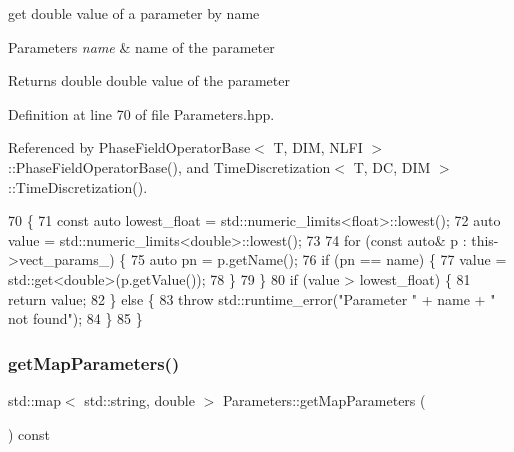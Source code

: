 get double value of a parameter by name 


\begin{DoxyParams}{Parameters}
{\em name} & name of the parameter \\
\hline
\end{DoxyParams}
\begin{DoxyReturn}{Returns}
double double value of the parameter 
\end{DoxyReturn}


Definition at line 70 of file Parameters.\+hpp.



Referenced by Phase\+Field\+Operator\+Base$<$ T, D\+I\+M, N\+L\+F\+I $>$\+::\+Phase\+Field\+Operator\+Base(), and Time\+Discretization$<$ T, D\+C, D\+I\+M $>$\+::\+Time\+Discretization().


\begin{DoxyCode}
70                                                                   \{
71   \textcolor{keyword}{const} \textcolor{keyword}{auto} lowest\_float = std::numeric\_limits<float>::lowest();
72   \textcolor{keyword}{auto} value = std::numeric\_limits<double>::lowest();
73 
74   \textcolor{keywordflow}{for} (\textcolor{keyword}{const} \textcolor{keyword}{auto}& p : this->vect\_params\_) \{
75     \textcolor{keyword}{auto} pn = p.getName();
76     \textcolor{keywordflow}{if} (pn == name) \{
77       value = std::get<double>(p.getValue());
78     \}
79   \}
80   \textcolor{keywordflow}{if} (value > lowest\_float) \{
81     \textcolor{keywordflow}{return} value;
82   \} \textcolor{keywordflow}{else} \{
83     \textcolor{keywordflow}{throw} std::runtime\_error(\textcolor{stringliteral}{"Parameter "} + name + \textcolor{stringliteral}{" not found"});
84   \}
85 \}
\end{DoxyCode}
\mbox{\label{classParameters_a3951bee7d4347d18d528cd0f5c3a2e67}} 
\subsubsection{\texorpdfstring{get\+Map\+Parameters()}{getMapParameters()}}
{\footnotesize\ttfamily std\+::map$<$ std\+::string, double $>$ Parameters\+::get\+Map\+Parameters (\begin{DoxyParamCaption}{ }\end{DoxyParamCaption}) const}



